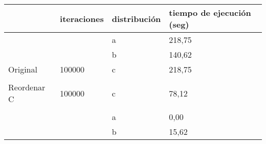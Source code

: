 \documentclass{article}
\begin{document}
	\begin{table}[h]
		\begin{tabular}{llll}
			\hline
			\rowcolor[HTML]{F8A102} 
			\multicolumn{1}{|l|}{\cellcolor[HTML]{F8A102}modificación} & \multicolumn{1}{l|}{\cellcolor[HTML]{F8A102}iteraciones} & \multicolumn{1}{l|}{\cellcolor[HTML]{F8A102}distribución} & \multicolumn{1}{l|}{\cellcolor[HTML]{F8A102}tiempo de ejecución (seg)} \\ \hline
			\multicolumn{1}{|l|}{}                                     & \multicolumn{1}{l|}{}                                    & \multicolumn{1}{l|}{a}                                    & \multicolumn{1}{l|}{218,75}                                      \\ \cline{3-4} 
			\multicolumn{1}{|l|}{}                                     & \multicolumn{1}{l|}{}                                    & \multicolumn{1}{l|}{b}                                    & \multicolumn{1}{l|}{140,62}                                      \\ \cline{3-4} 
			\multicolumn{1}{|l|}{\multirow{-3}{*}{Original}}           & \multicolumn{1}{l|}{\multirow{-3}{*}{100000}}            & \multicolumn{1}{l|}{c}                                    & \multicolumn{1}{l|}{218,75}                                      \\ \hline
			&                                                          &                                                           &                                                                  \\ \hline
			\multicolumn{1}{|l|}{Reordenar C}                          & \multicolumn{1}{l|}{100000}                              & \multicolumn{1}{l|}{c}                                    & \multicolumn{1}{l|}{78,12}                                       \\ \hline
			&                                                          &                                                           &                                                                  \\ \hline
			\multicolumn{1}{|l|}{}                                     & \multicolumn{1}{l|}{}                                    & \multicolumn{1}{l|}{a}                                    & \multicolumn{1}{l|}{0,00}                                        \\ \cline{3-4} 
			\multicolumn{1}{|l|}{}                                     & \multicolumn{1}{l|}{}                                    & \multicolumn{1}{l|}{b}                                    & \multicolumn{1}{l|}{15,62}                                       \\ \cline{3-4} 

\end{tabular}
\end{table}
\end{document}
